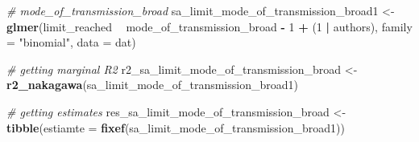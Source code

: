 \documentclass[
]{article}
\newenvironment{Shaded}{\begin{snugshade}}{\end{snugshade}}
\newcommand{\CommentTok}[1]{\textcolor[rgb]{0.56,0.35,0.01}{\textit{#1}}}
\newcommand{\DataTypeTok}[1]{\textcolor[rgb]{0.13,0.29,0.53}{#1}}
\newcommand{\DecValTok}[1]{\textcolor[rgb]{0.00,0.00,0.81}{#1}}
\newcommand{\KeywordTok}[1]{\textcolor[rgb]{0.13,0.29,0.53}{\textbf{#1}}}
\newcommand{\NormalTok}[1]{#1}
\newcommand{\OperatorTok}[1]{\textcolor[rgb]{0.81,0.36,0.00}{\textbf{#1}}}
\newcommand{\StringTok}[1]{\textcolor[rgb]{0.31,0.60,0.02}{#1}}
\begin{document}
\begin{Shaded}
\begin{Highlighting}[]
\CommentTok{# mode_of_transmission_broad}
\NormalTok{sa_limit_mode_of_transmission_broad1 <-}\StringTok{ }\KeywordTok{glmer}\NormalTok{(limit_reached }\OperatorTok{~}\StringTok{ }\NormalTok{mode_of_transmission_broad }\OperatorTok{-}\StringTok{ }
\StringTok{    }\DecValTok{1} \OperatorTok{+}\StringTok{ }\NormalTok{(}\DecValTok{1} \OperatorTok{|}\StringTok{ }\NormalTok{authors), }\DataTypeTok{family =} \StringTok{"binomial"}\NormalTok{, }\DataTypeTok{data =}\NormalTok{ dat)}

\CommentTok{# getting marginal R2}
\NormalTok{r2_sa_limit_mode_of_transmission_broad <-}\StringTok{ }\KeywordTok{r2_nakagawa}\NormalTok{(sa_limit_mode_of_transmission_broad1)}

\CommentTok{# getting estimates}
\NormalTok{res_sa_limit_mode_of_transmission_broad <-}\StringTok{ }\KeywordTok{tibble}\NormalTok{(}\DataTypeTok{estiamte =} \KeywordTok{fixef}\NormalTok{(sa_limit_mode_of_transmission_broad1))}


\end{Highlighting}
\end{Shaded}
\end{document}

